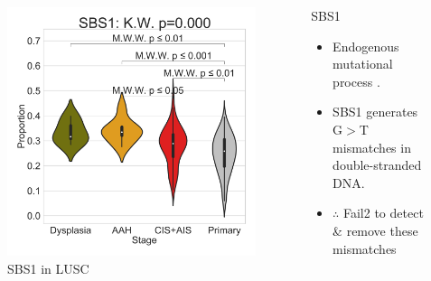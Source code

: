\documentclass{beamer}
\begin{document}
\begin{frame}[allowframebreaks]
                    \begin{columns}
                        \begin{column}{0.4 \textwidth}
                            \begin{figure}
                                \includegraphics[width=\linewidth]{figures/SigProfiler/BWA-Violin/COSMIC-SingleBase.SQC.Subtype.Relative/SBS1.pdf}
                                \caption{SBS1 in LUSC}
                            \end{figure}
                        \end{column}
                        \begin{column}{0.55 \textwidth}
                            \begin{block}{SBS1}
                                \begin{itemize}
                                    \item Endogenous mutational process \cite{signature-01}.
                                    \item SBS1 generates G$>$T mismatches in double-stranded DNA.
                                    \item $\therefore$ Fail2 to detect \& remove these mismatches
                                \end{itemize}
                            \end{block}
                        \end{column}
                    \end{columns}


\end{frame}
\end{document}

